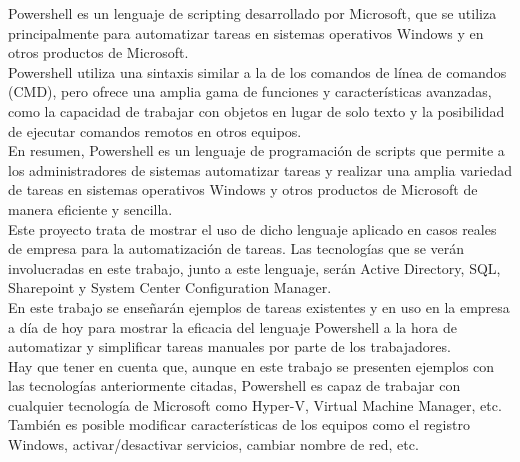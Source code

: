 \documentclass[a4paper, 12pt]{book}
\begin{document}
Powershell es un lenguaje de scripting desarrollado por Microsoft, que se utiliza principalmente para automatizar tareas en sistemas operativos Windows y en otros productos de Microsoft.
\\

Powershell utiliza una sintaxis similar a la de los comandos de línea de comandos (CMD), pero ofrece una amplia gama de funciones y características avanzadas, como la capacidad de trabajar con objetos en lugar de solo texto y la posibilidad de ejecutar comandos remotos en otros equipos.
\\

En resumen, Powershell es un lenguaje de programación de scripts que permite a los administradores de sistemas automatizar tareas y realizar una amplia variedad de tareas en sistemas operativos Windows y otros productos de Microsoft de manera eficiente y sencilla.
\\

Este proyecto trata de mostrar el uso de dicho lenguaje aplicado en casos reales de empresa para la automatización de tareas. Las tecnologías que se verán involucradas en este trabajo, junto a este lenguaje, serán Active Directory, SQL, Sharepoint y System Center Configuration Manager.
\\

En este trabajo se enseñarán ejemplos de tareas existentes y en uso en la empresa a día de hoy para mostrar la eficacia del lenguaje Powershell a la hora de automatizar y simplificar tareas manuales por parte de los trabajadores.
\\

Hay que tener en cuenta que, aunque en este trabajo se presenten ejemplos con las tecnologías anteriormente citadas, Powershell es capaz de trabajar con cualquier tecnología de Microsoft como Hyper-V, Virtual Machine Manager, etc. También es posible modificar características de los equipos como el registro Windows, activar/desactivar servicios, cambiar nombre de red, etc.



\end{document}
